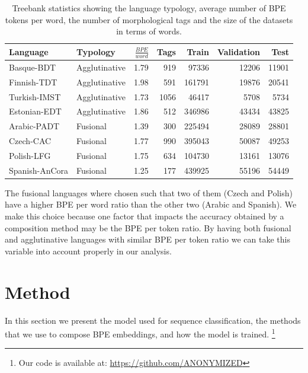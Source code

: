 \documentclass[11pt]{article}
\begin{document}
    	\begin{table} %
		\centering
		\begin{tabular}{l|lrrrrr}
			Language & Typology & $\frac{BPE}{word}$ & Tags & Train & Validation & Test \\
			\hline
			Basque-BDT      & Agglutinative & 1.79 & 919 & 97336 & 12206 & 11901 \\
			Finnish-TDT     & Agglutinative & 1.98 & 591 & 161791 & 19876 & 20541 \\
			Turkish-IMST    & Agglutinative & 1.73 & 1056 & 46417 & 5708 & 5734 \\
			Estonian-EDT    & Agglutinative & 1.86 & 512 & 346986 & 43434 & 43825 \\
            Arabic-PADT     & Fusional & 1.39 & 300 & 225494 & 28089 & 28801  \\
			Czech-CAC       & Fusional & 1.77 & 990 & 395043 & 50087 & 49253 \\
			Polish-LFG      & Fusional & 1.75 & 634 & 104730 & 13161 & 13076 \\
			Spanish-AnCora  & Fusional & 1.25 & 177 & 439925 & 55196 & 54449 \\
        \end{tabular}
    		\caption{\label{tab:data} Treebank statistics showing the
     language typology, average number of BPE tokens per word, the
     number of morphological tags and the size of the datasets in
     terms of words.}
	\end{table}
    
        The fusional languages where chosen such that two of them
        (Czech and Polish) have a higher BPE per word ratio than the
        other two (Arabic and Spanish). We make this choice because
        one factor that impacts the accuracy obtained by a composition
        method may be the BPE per token ratio.  By having both
        fusional and agglutinative languages with similar BPE per
        token ratio we can take this variable into account properly in
        our analysis.
        
	\section{Method}
	\label{method}
    	In this section we present the model used for sequence
     classification, the methods that we use to compose BPE
     embeddings, and how the model is trained. \footnote{Our code is
     available at: \url{https://github.com/ANONYMIZED}}
\end{document}
